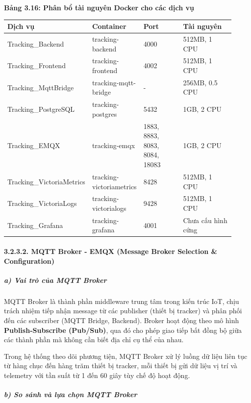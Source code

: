 \documentclass[13pt,a4paper]{extarticle}
\newcounter{none} %
\newcommand{\thesislongtableorignewline}{}
\let\thesislongtableorignewline\\
\renewcommand{\\}{\thesislongtableorignewline\hline}%
\let\\\thesislongtableorignewline
\newcommand{\thesistabletitle}[1]{%
  \begin{center}\textbf{#1}\end{center}%
}
\begin{document}
\thesistabletitle{Bảng 3.16: Phân bổ tài nguyên Docker cho các dịch vụ}

{\def\LTcaptype{none} %
\begin{longtable}{|p{0.30\linewidth}|p{0.16\linewidth}|p{0.20\linewidth}|p{0.26\linewidth}|}
\hline \textbf{Dịch vụ} & \textbf{Container} & \textbf{Port} & \textbf{Tài nguyên} \\
\hline
\endhead
\hline
\endlastfoot
Tracking\_Backend & tracking-backend & 4000 & 512MB, 1 CPU \\
Tracking\_Frontend & tracking-frontend & 4002 & 512MB, 1 CPU \\
Tracking\_MqttBridge & tracking-mqtt-bridge & - & 256MB, 0.5 CPU \\
Tracking\_PostgreSQL & tracking-postgres & 5432 & 1GB, 2 CPU \\
Tracking\_EMQX & tracking-emqx & 1883, 8883, 8083, 8084, 18083 & 1GB, 2
CPU \\
Tracking\_VictoriaMetrics & tracking-victoriametrics & 8428 & 512MB, 1
CPU \\
Tracking\_VictoriaLogs & tracking-victorialogs & 9428 & 512MB, 1 CPU \\
Tracking\_Grafana & tracking-grafana & 4001 & Chưa cấu hình cứng \\
\end{longtable}
}

\paragraph{3.2.3.2. MQTT Broker - EMQX (Message Broker Selection \&
Configuration)}\label{3232-mqtt-broker---emqx-message-broker-selection--configuration}

\subparagraph{a) Vai trò của MQTT
Broker}\label{a-vai-truxf2-cux1ee7a-mqtt-broker}

MQTT Broker là thành phần middleware trung tâm trong kiến trúc IoT, chịu
trách nhiệm tiếp nhận message từ các publisher (thiết bị tracker) và
phân phối đến các subscriber (MQTT Bridge, Backend). Broker hoạt động
theo mô hình \textbf{Publish-Subscribe (Pub/Sub)}, qua đó cho phép giao
tiếp bất đồng bộ giữa các thành phần mà không cần biết địa chỉ cụ thể
của nhau.

Trong hệ thống theo dõi phương tiện, MQTT Broker xử lý luồng dữ liệu
liên tục từ hàng chục đến hàng trăm thiết bị tracker, mỗi thiết bị gửi
dữ liệu vị trí và telemetry với tần suất từ 1 đến 60 giây tùy chế độ
hoạt động.

\subparagraph{b) So sánh và lựa chọn MQTT
Broker}\label{b-so-suxe1nh-vuxe0-lux1ef1a-chux1ecdn-mqtt-broker}
\end{document}
